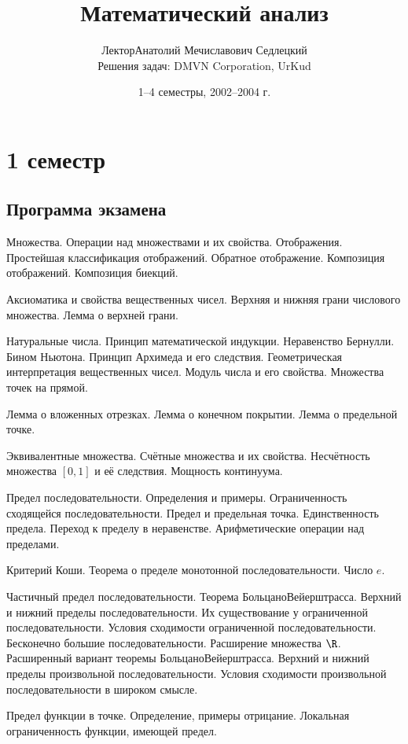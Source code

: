 \documentclass[a4paper]{article}
\title{Математический анализ}
\author{Лектор\т Анатолий Мечиславович Седлецкий\\
{\footnotesize Решения задач: DMVN Corporation, UrKud}}
\date{1--4 семестры, 2002--2004 г.}
\begin{document}
\maketitle

\section{1 семестр}

\subsection{Программа экзамена}

\begin{nums}{-2}
\item Множества. Операции над множествами и их свойства. Отображения. Простейшая классификация отображений.
Обратное отображение. Композиция отображений. Композиция биекций.
\item Аксиоматика и свойства вещественных чисел. Верхняя и нижняя грани числового множества. Лемма о верхней грани.
\item Натуральные числа. Принцип математической индукции. Неравенство Бернулли. Бином Ньютона.
Принцип Архимеда и его следствия. Геометрическая интерпретация вещественных чисел. Модуль числа и его свойства.
Множества точек на прямой.
\item Лемма о вложенных отрезках. Лемма о конечном покрытии. Лемма о предельной точке.
\item Эквивалентные множества. Счётные множества и их свойства. Несчётность множества $[0,1]$ и её следствия.
Мощность континуума.
\item Предел последовательности. Определения и примеры. Ограниченность сходящейся последовательности.
Предел и предельная точка. Единственность предела. Переход к пределу в неравенстве. Арифметические операции
над пределами.
\item Критерий Коши. Теорема о пределе монотонной последовательности. Число $e$.
\item Частичный предел последовательности. Теорема Больцано\ч Вейерштрасса. Верхний и нижний пределы последовательности.
Их существование у ограниченной последовательности. Условия сходимости ограниченной последовательности. Бесконечно
большие последовательности. Расширение множества $\R$. Расширенный вариант теоремы Больцано\ч Вейерштрасса. Верхний
и нижний пределы произвольной последовательности. Условия сходимости произвольной последовательности в широком смысле.
\item Предел функции в точке. Определение, примеры отрицание. Локальная ограниченность функции, имеющей предел.

\end{nums}
\end{document}
